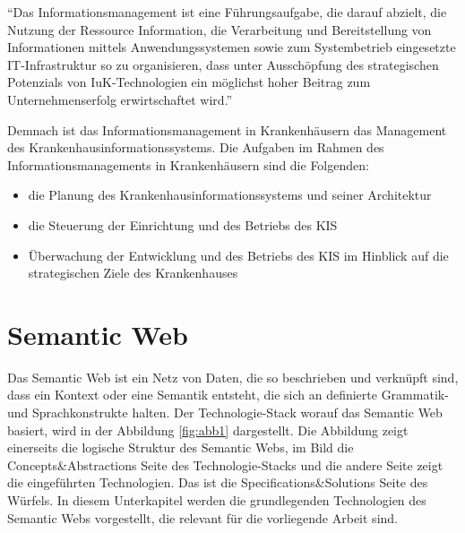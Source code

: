 \begin{addmargin}[10pt]{10pt}
\enquote{Das Informationsmanagement ist eine Führungsaufgabe, die darauf abzielt, die Nutzung der Ressource Information, die Verarbeitung und Bereitstellung von Informationen
mittels Anwendungssystemen sowie zum Systembetrieb eingesetzte IT-Infrastruktur so zu
organisieren, dass unter Ausschöpfung des strategischen Potenzials von IuK-Technologien
ein möglichst hoher Beitrag zum Unternehmenserfolg erwirtschaftet wird.} \\
\end{addmargin} 

Demnach ist das Informationsmanagement in Krankenhäusern das Management des Krankenhausinformationssystems.
Die Aufgaben im Rahmen des Informationsmanagements in Krankenhäusern sind die Folgenden:

\begin{itemize}
\item die Planung des Krankenhausinformationssystems und seiner Architektur
\item die Steuerung der Einrichtung und des Betriebs des \ac{KIS}
\item Überwachung der Entwicklung und des Betriebs des \ac{KIS} im Hinblick auf die strategischen Ziele des Krankenhauses \citep[vgl.]{winter_health_2011}
\end{itemize}

\section{Semantic Web}\label{sec:sw}

Das Semantic Web ist ein Netz von Daten, die so beschrieben und verknüpft sind, dass ein Kontext oder eine Semantik entsteht, die sich an definierte Grammatik- und Sprachkonstrukte halten. \citep[vgl.]{hebeler_semantic_2009}
Der Technologie-Stack worauf das Semantic Web basiert, wird in der Abbildung \ref{fig:abb1} dargestellt.
Die Abbildung zeigt einerseits die logische Struktur des Semantic Webs, im Bild die Concepts\&Abstractions Seite des Technologie-Stacks und die andere Seite zeigt die eingeführten Technologien.
Das ist die Specifications\&Solutions Seite des Würfels.
In diesem Unterkapitel werden die grundlegenden Technologien des Semantic Webs vorgestellt, die relevant für die vorliegende Arbeit sind.

